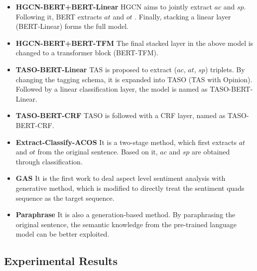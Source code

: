 \documentclass[11pt]{article}
\begin{document}
\noindent
\begin{itemize}[leftmargin=*]
\item \textbf{HGCN-BERT+BERT-Linear} \; HGCN \cite{cai2020aspect} aims to jointly extract $ac$ and $sp$. Following it, BERT extracts $at$ and $ot$ \cite{li-etal-2019-exploiting}. Finally, stacking a linear layer (BERT-Linear) forms the full model.
\item \textbf{HGCN-BERT+BERT-TFM} \; The final stacked layer in the above model is changed to a transformer block (BERT-TFM).
\item \textbf{TASO-BERT-Linear} \; TAS \cite{wan2020target} is proposed to extract ($ac$, $at$, $sp$) triplets. By changing the tagging schema, it is expanded into TASO (TAS with Opinion). Followed by a linear classification layer, the model is named as TASO-BERT-Linear.
\item \textbf{TASO-BERT-CRF} \; TASO is followed with a CRF layer, named as TASO-BERT-CRF.
\item \textbf{Extract-Classify-ACOS} \cite{cai2021aspect} \; It is a two-stage method, which first extracts $at$ and $ot$ from the original sentence. Based on it, $ac$ and $sp$ are obtained through classification. 
\item \textbf{GAS} \cite{zhang-etal-2021-towards-generative} \; It is the first work to deal aspect level sentiment analysis with generative method, which is modified to directly treat the sentiment quads sequence as the target sequence.
\item \textbf{Paraphrase} \cite{zhang-etal-2021-aspect-sentiment} \; It is also a generation-based method. By paraphrasing the original sentence, the semantic knowledge from the pre-trained language model can be better exploited.
\end{itemize}
















\subsection{Experimental Results}
\end{document}
